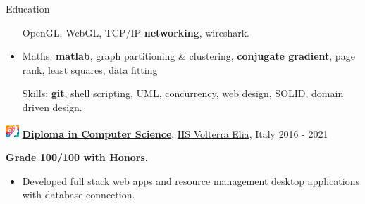 \documentclass{cv} %
\def\intraexpvspace{0.15cm}
\def\titlelistvspace{-0.15cm}
\begin{document}
\begin{rSection}{Education}
\begin{itemize}
              OpenGL,
              WebGL,
              TCP/IP \textbf{networking},
              wireshark.
        \item Maths:
              \textbf{matlab},
              graph partitioning \& clustering,
              \textbf{conjugate gradient},
              page rank,
              least squares,
              data fitting

              \vspace*{-0.1cm}\hspace*{-0.4cm}\underline{Skills}:
              \textbf{git},
              shell scripting,
              UML,
              concurrency,
              web design,
              SOLID,
              domain driven design.
    \end{itemize}
    \vspace{\intraexpvspace}
    \includegraphics[width=0.5cm, trim={0cm 1cm 0cm 0cm}]{iisve-icon.png}
    {\bf \underline{Diploma in Computer Science}},
    \href{https://www.istitutovolterraelia.it/}{IIS Volterra Elia},
    Italy
    \hfill{2016 - 2021}

    \textbf{Grade 100/100 with Honors}.

    \vspace{\titlelistvspace}\begin{itemize}
        \itemsep -3pt {}
        \item Developed full stack web apps and resource management desktop applications with database connection.
    \end{itemize}


\end{rSection}
\end{document}
